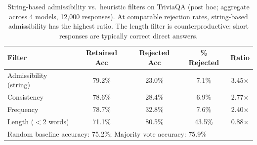 \begin{table}[h]
\centering
\begin{tabular}{lcccc}
\toprule
Filter & Retained Acc & Rejected Acc & \% Rejected & Ratio \\
\midrule
Admissibility (string) & 79.2\% & 23.0\% & 7.1\% & 3.45$\times$ \\
Consistency & 78.6\% & 28.4\% & 6.9\% & 2.77$\times$ \\
Frequency & 78.7\% & 32.8\% & 7.6\% & 2.40$\times$ \\
Length ($<$2 words) & 71.1\% & 80.5\% & 43.5\% & 0.88$\times$ \\
\midrule
\multicolumn{5}{l}{\footnotesize Random baseline accuracy: 75.2\%; Majority vote accuracy: 75.9\%} \\
\bottomrule
\end{tabular}
\caption{String-based admissibility vs.\ heuristic filters on TriviaQA (post hoc; aggregate across 4 models, 12,000 responses). At comparable rejection rates, string-based admissibility has the highest ratio. The length filter is counterproductive: short responses are typically correct direct answers.}
\label{tab:filter-comparison}
\end{table}
